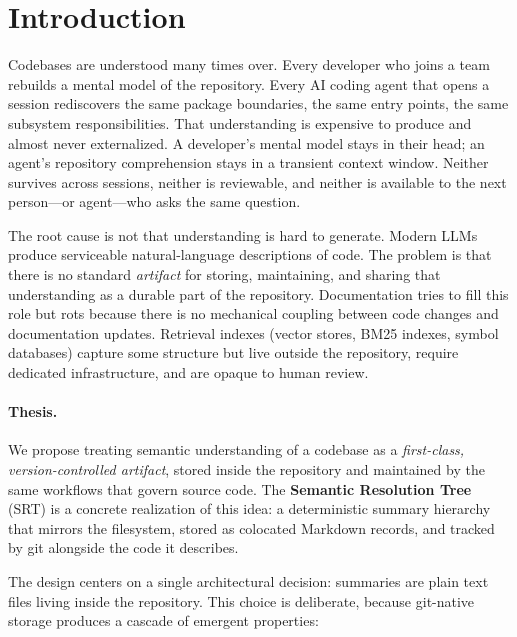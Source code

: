 \documentclass[11pt,a4paper]{article}
\newcommand{\srt}{\textsc{SRT}}
\begin{document}
\section{Introduction}\label{sec:intro}

Codebases are understood many times over.
Every developer who joins a team rebuilds a mental model of the repository.
Every AI coding agent that opens a session rediscovers the same package boundaries, the same entry points, the same subsystem responsibilities.
That understanding is expensive to produce and almost never externalized.
A developer's mental model stays in their head; an agent's repository comprehension stays in a transient context window.
Neither survives across sessions, neither is reviewable, and neither is available to the next person---or agent---who asks the same question.

The root cause is not that understanding is hard to generate.
Modern LLMs produce serviceable natural-language descriptions of code.
The problem is that there is no standard \emph{artifact} for storing, maintaining, and sharing that understanding as a durable part of the repository.
Documentation tries to fill this role but rots because there is no mechanical coupling between code changes and documentation updates.
Retrieval indexes (vector stores, BM25 indexes, symbol databases) capture some structure but live outside the repository, require dedicated infrastructure, and are opaque to human review.

\paragraph{Thesis.}
We propose treating semantic understanding of a codebase as a \emph{first-class, version-controlled artifact}, stored inside the repository and maintained by the same workflows that govern source code.
The \textbf{Semantic Resolution Tree} (\srt{}) is a concrete realization of this idea: a deterministic summary hierarchy that mirrors the filesystem, stored as colocated Markdown records, and tracked by git alongside the code it describes.

The design centers on a single architectural decision: summaries are plain text files living inside the repository.
This choice is deliberate, because git-native storage produces a cascade of emergent properties:
\end{document}

